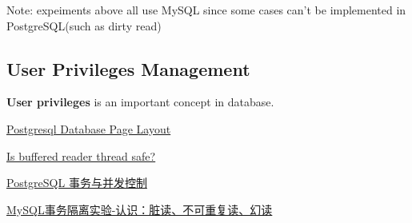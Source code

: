 \documentclass[onecolumn, oneside, ctexart, UTF8, b4paper]{SUSTechHomework}
\begin{document}
Note: expeiments above all use MySQL since some cases can't be implemented in PostgreSQL(such as dirty read)

\subsection{\textbf{User Privileges Management}}
\textbf{User privileges} is an important concept in database.

\begin{thebibliography}{20}
\href{https://www.postgresql.org/docs/current/storage-page-layout.html}{Postgresql Database Page Layout}

\href{https://stackoverflow.com/questions/8342172/is-buffered-reader-thread-safe}{Is buffered reader thread safe?}

\href{https://blog.csdn.net/fsdgsddaer/article/details/120606535}{PostgreSQL 事务与并发控制}

\href{https://juejin.cn/post/6844903681196982285}{MySQL事务隔离实验-认识：脏读、不可重复读、幻读}

\end{thebibliography}
\end{document}
